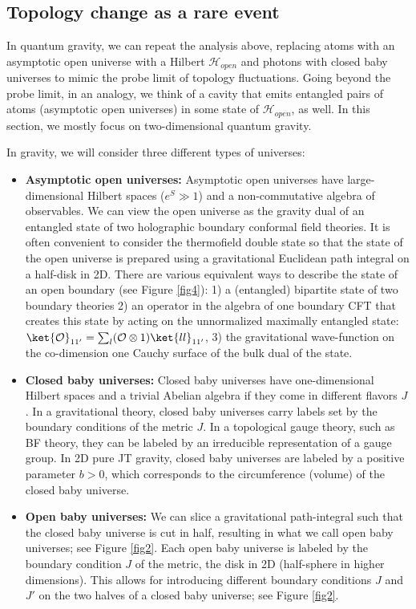\documentclass[a4paper,11pt]{article}
\theoremstyle{definition}
\numberwithin{equation}{section}
\newcommand{\mH}{\mathcal{H}}
\newcommand{\mO}{\mathcal{O}}
\begin{document}
\subsection{Topology change as a rare event}\label{subsec:topol}

 In quantum gravity, we can repeat the analysis above, replacing atoms with an asymptotic open universe with a Hilbert $\mH_{open}$ and photons with closed baby universes to mimic the probe limit of topology fluctuations. Going beyond the probe limit, in an analogy, we think of a cavity that emits entangled pairs of atoms (asymptotic open universes) in some state of $\mH_{open}$, as well. In this section, we mostly focus on two-dimensional quantum gravity.
 
 In gravity, we will consider three different types of universes:
 \begin{itemize}
     \item {\bf Asymptotic open universes:} Asymptotic open universes have large-dimensional Hilbert spaces ($e^S\gg 1$) and a non-commutative algebra of observables. We can view the open universe as the gravity dual of an entangled state of two holographic boundary conformal field theories. It is often convenient to consider the thermofield double state so that the state of the open universe is prepared using a gravitational Euclidean path integral on a half-disk in 2D. 
     There are various equivalent ways to describe the state of an open boundary (see Figure \ref{fig4}): 1) a (entangled) bipartite state of two boundary theories  2) an operator in the algebra of one boundary CFT that creates this state by acting on the unnormalized maximally entangled state: $\ket{\mO}_{11'}=\sum_l(\mO\otimes 1)\ket{ll}_{11'}$, 3) the gravitational wave-function on the co-dimension one Cauchy surface of the bulk dual of the state. 
    

\item {\bf Closed baby universes:} Closed baby universes have one-dimensional Hilbert spaces and a trivial Abelian algebra if they come in different flavors $J$. In a gravitational theory, closed baby universes carry labels set by the boundary conditions of the metric $J$. In a topological gauge theory, such as BF theory, they can be labeled by an irreducible representation of a gauge group. In 2D pure JT gravity, closed baby universes are labeled by a positive parameter $b>0$, which corresponds to the circumference (volume) of the closed baby universe. 


\item{\bf Open baby universes:} We can slice a gravitational path-integral such that the closed baby universe is cut in half, resulting in what we call open baby universes; see Figure \ref{fig2}. Each open baby universe is labeled by the boundary condition $J$ of the metric, the disk in 2D (half-sphere in higher dimensions). This allows for introducing different boundary conditions $J$ and $J'$ on the two halves of a closed baby universe; see Figure \ref{fig2}. 

 \end{itemize}
\end{document}
